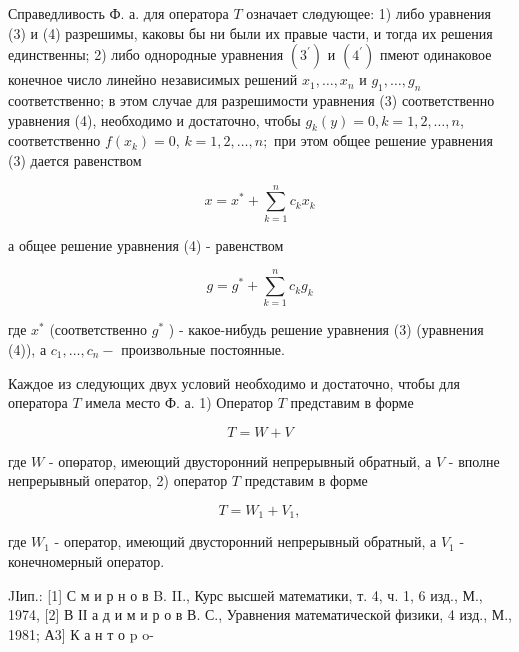 \documentclass[10pt]{article}
\begin{document}
Справедливость Ф. а. для оператора $T$ означает слөдующее: 1) либо уравнения (3) и (4) разрешимы, каковы бы ни были их правые части, и тогда их решения единственны; 2) либо однородные уравнения $\left(3^{\prime}\right)$ и $\left(4^{\prime}\right)$ пмеют одинаковое конечное число линейно независимых решений $x_{1}, \ldots, x_{n}$ и $g_{1}, \ldots, g_{n}$ соответственно; в этом случае для разрешимости уравнения (3) соответственно уравнения (4), необходимо и достаточно, чтобы $g_{k}(y)=0, k=1,2, \ldots, n$, соответственно $f\left(x_{k}\right)=0$, $k=1,2, \ldots, n ;$ при этом общее решение уравнения (3) дается равенством



\[

x=x^{*}+\sum_{k=1}^{n} c_{k} x_{k}

\]



а общее решение уравнения (4) - равенством



\[

g=g^{*}+\sum_{k=1}^{n} c_{k} g_{k}

\]



где $x^{*}$ (соответственно $g^{*}$ ) - какое-нибудь решение уравнения (3) (уравнения (4)), а $c_{1}, \ldots, c_{n}-$ произвольные постоянные.



Каждое из следующих двух условий необходимо и достаточно, чтобы для оператора $T$ имела место Ф. а. 1) Оператор $T$ представим в форме



\[

T=W+V

\]



где $W$ - опөратор, имеющий двусторонний непрерывный обратный, а $V$ - вполне непрерывный оператор, 2) оператор $T$ представим в форме



\[

T=W_{1}+V_{1},

\]



где $W_{1}$ - оператор, имеющий двусторонний непрерывный обратный, а $V_{1}$ - конечномерный оператор.



JІип.: [1] С м и р н о в B. II., Курс высшей математики, т. 4, ч. 1, 6 изд., М., 1974, [2] В ІІ а д и м и р о в В. С., Уравнения математической физики, 4 изд., М., 1981; А3] К а н т о p o-
\end{document}
